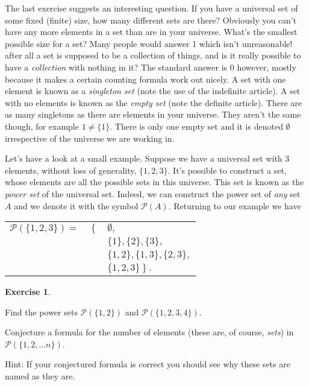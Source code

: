 \documentclass[10pt,]{book}
\theoremstyle{plain}
\theoremstyle{definition}
\theoremstyle{definition}
\newtheorem{exercise}[theorem]{Exercise}
\numberwithin{equation}{section}
\begin{document}
    The last exercise suggests an interesting question. If you have
    a universal set of some fixed (finite) size, how many different sets
    are there? Obviously you can't have any more elements in a set than
    are in your universe. What's the smallest possible size for a set?
    Many people would answer 1 \textemdash{} which isn't unreasonable! \textemdash{} after all
    a set is supposed to be a collection of things, and is it really possible
    to have a \emph{collection} with nothing in it? The standard answer is
    0 however, mostly because it makes a certain counting formula work out
    nicely. A set with one element is known as a
    \emph{singleton set}
    (note the use of the indefinite article). A set with no elements
    is known as the
    \emph{empty set} (note the definite article). There
    are as many singletons as there are elements in your universe. They
    aren't the same though, for example \(1 \neq \{ 1 \}\). There is
    only one empty set and it is denoted \(\emptyset\) \textemdash{} irrespective of the
    universe we are working in.
\par

    Let's have a look at a small example. Suppose we have a universal set
    with 3 elements, without loss of generality, \(\{1, 2, 3\}\). It's
    possible to construct a set, whose elements are all the possible sets
    in this universe. This set is known as the
    \emph{power set} of the universal
    set. Indeed, we can construct the power set of \emph{any} set \(A\) and
    we denote it with the symbol \({\mathcal P}(A)\). Returning to our
    example we have
\begin{tabular}{lll}
\({\mathcal P}(\{1, 2, 3 \}) =\)&\(\left\{   \right.\)&\(\emptyset,\)\tabularnewline[0pt]
&&\(\{ 1 \},  \{ 2 \},  \{ 3 \},\)\tabularnewline[0pt]
&&\(\{ 1, 2 \},  \{ 1, 3 \},  \{ 2, 3 \},\)\tabularnewline[0pt]
&&\(\left.   \{ 1, 2, 3 \}  \right\}.\)
\end{tabular}
\begin{exercise}\label{exercise-32}

        Find the power sets \({\mathcal P}(\{1, 2 \})\) and
        \({\mathcal P}(\{1, 2, 3, 4 \})\).
\par

        Conjecture a formula for the number
        of elements (these are, of course, \emph{sets}) in
        \({\mathcal P}(\{1, 2, \ldots n \})\).
\par

        Hint: If your conjectured formula is correct you should see
        why these sets are named as they are.
\end{exercise}
\par
\end{document}
